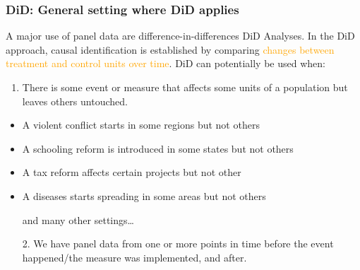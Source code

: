 \documentclass[12pt,english,dvipsnames,aspectratio=169,handout]{beamer}\usepackage[]{graphicx}\usepackage[]{xcolor}
\begin{document}
\begin{frame}
  \frametitle{DiD: General setting where DiD applies}
\footnotesize
A major use of panel data are difference-in-differences DiD Analyses. In the DiD approach, causal identification is established by comparing \textcolor{orange}{changes between treatment and control units over time}. DiD can potentially be used when:
\begin{enumerate}\footnotesize
  \item There is some event or measure that affects some units of a population but leaves others untouched.
\end{enumerate}
    \vspace{-3mm} \begin{itemize} \scriptsize
      \item A violent conflict starts in some regions but not others
      \item A schooling reform is introduced in some states but not others
      \item A tax reform affects certain projects but not other
      \item A diseases starts spreading in some areas but not others
      \item[] and many other settings\ldots
    \end{itemize} \vspace{-3mm}
\begin{enumerate} \footnotesize
  \item[2.] We have panel data from one or more points in time before the event happened/the measure was implemented, and after.
  \end{enumerate}
\end{frame}
\end{document}
